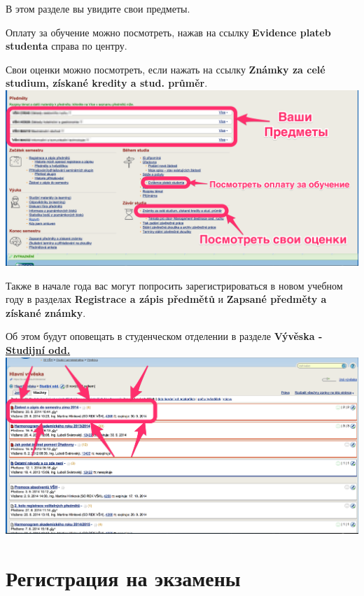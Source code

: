 \documentclass[a4paper,12pt]{article}
\begin{document}
В этом разделе вы увидите свои предметы.

Оплату за обучение можно посмотреть, 
нажав на ссылку \textbf{Evidence plateb studenta} справа по центру.

Свои оценки можно посмотреть, 
если нажать 
на ссылку \textbf{Známky za celé studium, získané kredity a stud. průměr}. \\

\includegraphics[width=\textwidth]{s18} \\

\newpage

Также в начале года вас могут попросить зарегистрироваться в новом учебном году в разделах
\textbf{Registrace a zápis předmětů} и \textbf{Zapsané předměty a získané známky}.

Об этом будут оповещать 
в студенческом отделении в разделе 
\textbf{Vývěska - \href{https://is.vsh.cz/auth/bb/skola/studijni/}{Studijní odd.}} \\

\includegraphics[width=\textwidth]{s19} \\

\newpage

\section{Регистрация на экзамены}
\end{document}
